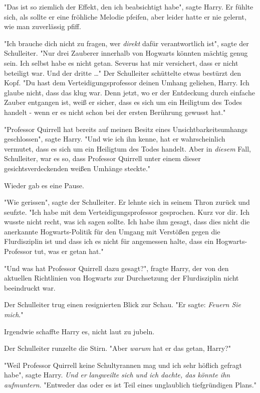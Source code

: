 {"Das ist so ziemlich der Effekt, den ich beabsichtigt habe", sagte Harry. Er fühlte sich, als sollte er eine fröhliche Melodie pfeifen, aber leider hatte er nie gelernt, wie man zuverlässig pfiff.

"Ich brauche dich nicht zu fragen, wer \emph{direkt} dafür verantwortlich ist", sagte der Schulleiter. "Nur drei Zauberer innerhalb von Hogwarts könnten mächtig genug sein. Ich selbst habe es nicht getan. Severus hat mir versichert, dass er nicht beteiligt war. Und der dritte …" Der Schulleiter schüttelte etwas bestürzt den Kopf. "Du hast dem Verteidigungsprofessor deinen Umhang geliehen, Harry. Ich glaube nicht, dass das klug war. Denn jetzt, wo er der Entdeckung durch einfache Zauber entgangen ist, weiß er sicher, dass es sich um ein Heiligtum des Todes handelt - wenn er es nicht schon bei der ersten Berührung gewusst hat."

"Professor Quirrell hat bereits auf meinen Besitz eines Unsichtbarkeitsumhangs geschlossen", sagte Harry. "Und wie ich ihn kenne, hat er wahrscheinlich vermutet, dass es sich um ein Heiligtum des Todes handelt. Aber in \emph{diesem} Fall, Schulleiter, war es so, dass Professor Quirrell unter einem dieser gesichtsverdeckenden weißen Umhänge steckte."

Wieder gab es eine Pause.

"Wie gerissen", sagte der Schulleiter. Er lehnte sich in seinem Thron zurück und seufzte. "Ich habe mit dem Verteidigungsprofessor gesprochen. Kurz vor dir. Ich wusste nicht recht, was ich sagen sollte. Ich habe ihm gesagt, dass dies nicht die anerkannte Hogwarts-Politik für den Umgang mit Verstößen gegen die Flurdisziplin ist und dass ich es nicht für angemessen halte, dass ein Hogwarts-Professor tut, was er getan hat."

"Und was hat Professor Quirrell dazu gesagt?", fragte Harry, der von den aktuellen Richtlinien von Hogwarts zur Durchsetzung der Flurdisziplin nicht beeindruckt war.

Der Schulleiter trug einen resignierten Blick zur Schau. "Er sagte: \emph{Feuern Sie mich}."

Irgendwie schaffte Harry es, nicht laut zu jubeln.

Der Schulleiter runzelte die Stirn. "Aber \emph{warum} hat er das getan, Harry?"

"Weil Professor Quirrell keine Schultyrannen mag und ich sehr höflich gefragt habe", sagte Harry. \emph{Und er} \emph{langweilte} \emph{sich und ich dachte, das könnte ihn aufmuntern}. "Entweder das oder es ist Teil eines unglaublich tiefgründigen Plans."

}
